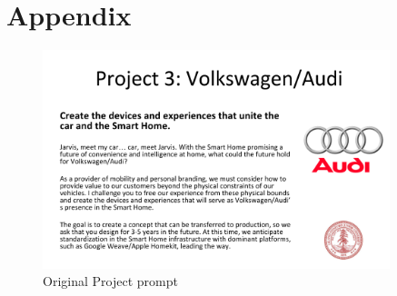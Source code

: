\chapter*{Appendix}

\setcounter{section}{0}

\renewcommand\thesection{\Alph{section}}

\vspace{1em}

\begin{figure}[h]
   \centering
     \includegraphics[width=0.9\textwidth]{Figures/Appendix/project_prompt}
   \caption{Original Project prompt}
   \label{fig:projectprompt}
\end{figure}

\label{sec:benchmarkingAppendix}


\label{sec:PreviousPrototypes}


\label{sec:app_code}

